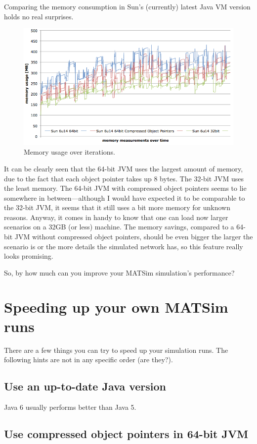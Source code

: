 Comparing the memory consumption in Sun's (currently) latest Java VM version holds no real surprises.
\begin{figure}[h]
\centering
\includegraphics[width=0.75\linewidth]{figures/benchmarks/benchmark_memory}
\caption{Memory usage over iterations.}
\label{fig:Benchmark04}
\end{figure}

It can be clearly seen that the 64-bit JVM uses the largest amount of memory, due to the fact that each object pointer takes up 8 bytes. The 32-bit JVM uses the least memory. The 64-bit JVM with compressed object pointers seems to lie somewhere in between—although I would have expected it to be comparable to the 32-bit JVM, it seems that it still uses a bit more memory for unknown reasons. Anyway, it comes in handy to know that one can load now larger scenarios on a 32GB (or less) machine. The memory savings, compared to a 64-bit JVM without compressed object pointers, should be even bigger the larger the scenario is or the more details the simulated network has, so this feature really looks promising.
 
So, by how much can you improve your MATSim simulation's performance?

\section{Speeding up your own MATSim runs}
There are a few things you can try to speed up your simulation runs. The following hints are not in any specific order {\color{red}(are they?)}.

\subsection{Use an up-to-date Java version}
Java 6 usually performs better than Java 5.

\subsection{Use compressed object pointers in 64-bit JVM}

